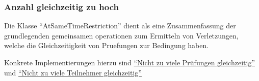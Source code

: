 \subsubsection{Anzahl gleichzeitig zu hoch}
Die Klasse \enquote{AtSameTimeRestriction} dient als eine Zusammenfassung der grundlegenden
gemeinsamen operationen zum Ermitteln von Verletzungen, welche die Gleichzeitigkeit von Pruefungen
zur Bedingung haben.

Konkrete Implementierungen hierzu sind
\hyperref[subsubsec:nicht-zu-viele-pruefungen-gleichzeitig]{\enquote{Nicht zu viele Prüfungen gleichzeitig}}
und
\hyperref[subsubsec:nicht-zu-viele-teilnehmer-gleichzeitig]{\enquote{Nicht zu viele Teilnehmer gleichzeitig}}
